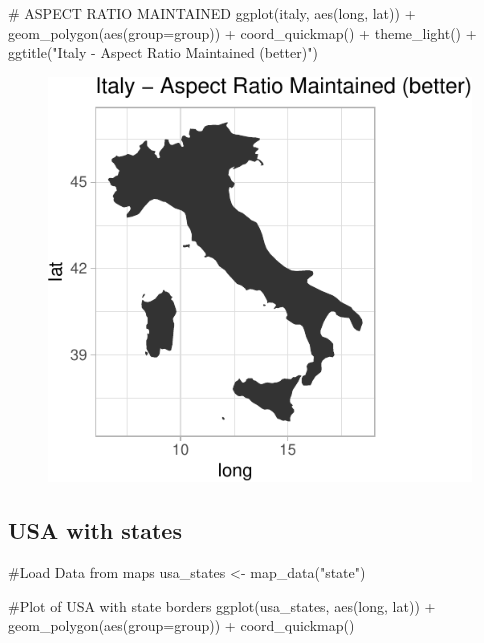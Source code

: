\documentclass[
  letterpaper,
  DIV=11,
  numbers=noendperiod]{scrartcl}
\newenvironment{Shaded}{\begin{snugshade}}{\end{snugshade}}
\newcommand{\AttributeTok}[1]{\textcolor[rgb]{0.40,0.45,0.13}{#1}}
\newcommand{\CommentTok}[1]{\textcolor[rgb]{0.37,0.37,0.37}{#1}}
\newcommand{\FunctionTok}[1]{\textcolor[rgb]{0.28,0.35,0.67}{#1}}
\newcommand{\NormalTok}[1]{\textcolor[rgb]{0.00,0.23,0.31}{#1}}
\newcommand{\OtherTok}[1]{\textcolor[rgb]{0.00,0.23,0.31}{#1}}
\newcommand{\SpecialCharTok}[1]{\textcolor[rgb]{0.37,0.37,0.37}{#1}}
\newcommand{\StringTok}[1]{\textcolor[rgb]{0.13,0.47,0.30}{#1}}
\begin{document}
\begin{Shaded}
\begin{Highlighting}[]
\CommentTok{\# ASPECT RATIO MAINTAINED}
\FunctionTok{ggplot}\NormalTok{(italy, }\FunctionTok{aes}\NormalTok{(long, lat)) }\SpecialCharTok{+} 
  \FunctionTok{geom\_polygon}\NormalTok{(}\FunctionTok{aes}\NormalTok{(}\AttributeTok{group=}\NormalTok{group)) }\SpecialCharTok{+} 
  \FunctionTok{coord\_quickmap}\NormalTok{()  }\SpecialCharTok{+}
  \FunctionTok{theme\_light}\NormalTok{() }\SpecialCharTok{+}
  \FunctionTok{ggtitle}\NormalTok{(}\StringTok{"Italy {-} Aspect Ratio Maintained (better)"}\NormalTok{)}
\end{Highlighting}
\end{Shaded}

\begin{figure}[H]

{\centering \includegraphics{118_K_maps1_files/figure-pdf/unnamed-chunk-5-1.pdf}

}

\end{figure}

\hypertarget{usa-with-states}{%
\subsection{USA with states}\label{usa-with-states}}

\begin{Shaded}
\begin{Highlighting}[]
\CommentTok{\#Load Data from maps}
\NormalTok{usa\_states }\OtherTok{\textless{}{-}} \FunctionTok{map\_data}\NormalTok{(}\StringTok{"state"}\NormalTok{)}

\CommentTok{\#Plot of USA with state borders}
\FunctionTok{ggplot}\NormalTok{(usa\_states, }\FunctionTok{aes}\NormalTok{(long, lat)) }\SpecialCharTok{+}
\FunctionTok{geom\_polygon}\NormalTok{(}\FunctionTok{aes}\NormalTok{(}\AttributeTok{group=}\NormalTok{group)) }\SpecialCharTok{+}
\FunctionTok{coord\_quickmap}\NormalTok{()}
\end{Highlighting}
\end{Shaded}
\end{document}
